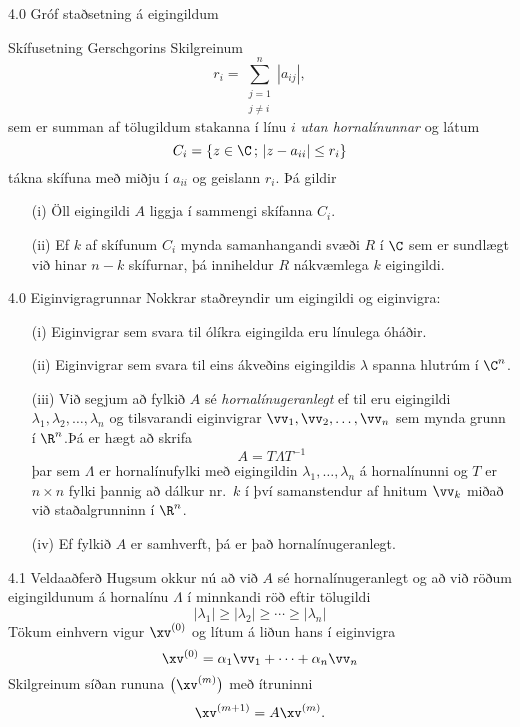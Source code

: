 \begin{frame}{4.0 Gróf staðsetning á eigingildum} 
\begin{block}{Skífusetning Gerschgorins}  
Skilgreinum
$$
r_i=\sum\limits_{{\substack{j=1 \\ j\neq i}}}^n|a_{ij}|,
$$
sem er summan af tölugildum stakanna í línu $i$ {\it utan  hornalínunnar} \pause
og látum
$$
C_i=\{z\in \C\,;\, |z-a_{ii}|\leq r_i\}
$$ 
tákna skífuna með miðju í $a_{ii}$ og geislann $r_i$. \pause 
Þá gildir
\begin{enumerate}
\item[(i)] Öll eigingildi $A$ liggja í sammengi skífanna $C_i$.
\pause
\item[(ii)] Ef $k$ af skífunum $C_i$ mynda samanhangandi svæði $R$ 
í $\C$ sem er sundlægt við hinar $n-k$ skífurnar, þá inniheldur $R$ 
nákvæmlega $k$ eigingildi.
\end{enumerate}
\end{block}
\end{frame}

\begin{frame}{4.0 Eiginvigragrunnar} 
Nokkrar staðreyndir um eigingildi og eiginvigra:\pause
\begin{enumerate}
\item[(i)]  Eiginvigrar sem svara til ólíkra eigingilda eru línulega
  óháðir. 
\pause
\item[(ii)] Eiginvigrar sem svara til eins ákveðins eigingildis 
$\lambda$ spanna hlutrúm í $\C^n$.
\pause
\item[(iii)] Við segjum að fylkið $A$ sé \emph{hornalínugeranlegt} ef
  til eru eigingildi $\lambda_1,\lambda_2,\dots,\lambda_n$ og
  tilsvarandi eiginvigrar $\vv_1,\vv_2,\dots,\vv_n$ sem mynda grunn í
  $\R^n$.\pause Þá er hægt að skrifa 
$$
A=T\Lambda T^{-1}
$$
þar sem $\Lambda$ er hornalínufylki með eigingildin
$\lambda_1,\dots,\lambda_n$ á hornalínunni og $T$ er $n\times n$ fylki
þannig að dálkur nr.~$k$ í því samanstendur af hnitum $\vv_k$ miðað
við staðalgrunninn í $\R^n$.
\pause
\item[(iv)] Ef fylkið $A$ er samhverft, þá er það hornalínugeranlegt.
\end{enumerate}
\end{frame}

\begin{frame}{4.1 Veldaaðferð} 
Hugsum okkur nú að við $A$ sé hornalínugeranlegt og að við röðum 
eigingildunum á hornalínu $\Lambda$ í minnkandi röð eftir tölugildi
$$
|\lambda_1|\geq |\lambda_2|\geq \cdots\geq |\lambda_n|
$$
\pause
Tökum einhvern vigur $\xv^{(0)}$ og lítum á liðun hans í eiginvigra
$$
\xv^{(0)}=\alpha_1\vv_1+\cdots+\alpha_n\vv_n
$$
\pause
Skilgreinum síðan rununa $\big(\xv^{(m)}\big)$ með ítruninni
$$
\xv^{(m+1)}=A\xv^{(m)}.
$$
\end{frame}

